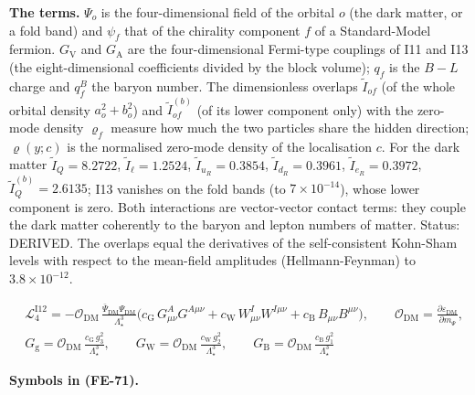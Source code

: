\documentclass[
  10pt,
]{article}
\begin{document}
\textbf{The terms.} \(\Psi_o\) is the four-dimensional field of the
orbital \(o\) (the dark matter, or a fold band) and \(\psi_f\) that of
the chirality component \(f\) of a Standard-Model fermion.
\(G_{\mathrm{V}}\) and \(G_{\mathrm{A}}\) are the four-dimensional
Fermi-type couplings of I11 and I13 (the eight-dimensional coefficients
divided by the block volume); \(q_f\) is the \(B - L\) charge and
\(q^B_f\) the baryon number. The dimensionless overlaps
\(\tilde I_{of}\) (of the whole orbital density \(a_o^2 + b_o^2\)) and
\(\tilde I^{(b)}_{of}\) (of its lower component only) with the zero-mode
density \(\varrho_f\) measure how much the two particles share the
hidden direction; \(\varrho(y; c)\) is the normalised zero-mode density
of the localisation \(c\). For the dark matter \(\tilde I_Q = 8.2722\),
\(\tilde I_\ell = 1.2524\), \(\tilde I_{u_R} = 0.3854\),
\(\tilde I_{d_R} = 0.3961\), \(\tilde I_{e_R} = 0.3972\),
\(\tilde I^{(b)}_Q = 2.6135\); I13 vanishes on the fold bands (to
\(7\times10^{-14}\)), whose lower component is zero. Both interactions
are vector-vector contact terms: they couple the dark matter coherently
to the baryon and lepton numbers of matter. Status: DERIVED. The
overlaps equal the derivatives of the self-consistent Kohn-Sham levels
with respect to the mean-field amplitudes (Hellmann-Feynman) to
\(3.8\times10^{-12}\).

\[
\begin{aligned}
&\mathcal{L}_4^{\mathrm{I12}} =
 -\mathcal{O}_{\mathrm{DM}}\,\frac{\bar\Psi_{\mathrm{DM}}\Psi_{\mathrm{DM}}}{\Lambda_\star^3}
 \big(c_{\mathrm{G}}\,G^A_{\mu\nu}G^{A\mu\nu} + c_{\mathrm{W}}\,W^I_{\mu\nu}W^{I\mu\nu} +
 c_{\mathrm{B}}\,B_{\mu\nu}B^{\mu\nu}\big),\qquad
 \mathcal{O}_{\mathrm{DM}} = \frac{\partial\varepsilon_{\mathrm{DM}}}{\partial m_\Psi},\\
&G_{\mathrm{g}} = \mathcal{O}_{\mathrm{DM}}\,\frac{c_{\mathrm{G}}\,g_3^2}{\Lambda_\star^3},\qquad
 G_{\mathrm{W}} = \mathcal{O}_{\mathrm{DM}}\,\frac{c_{\mathrm{W}}\,g_2^2}{\Lambda_\star^3},\qquad
 G_{\mathrm{B}} = \mathcal{O}_{\mathrm{DM}}\,\frac{c_{\mathrm{B}}\,g_1^2}{\Lambda_\star^3}
\end{aligned} \tag{FE-71}
\]

\textbf{Symbols in (FE-71).}
\end{document}
